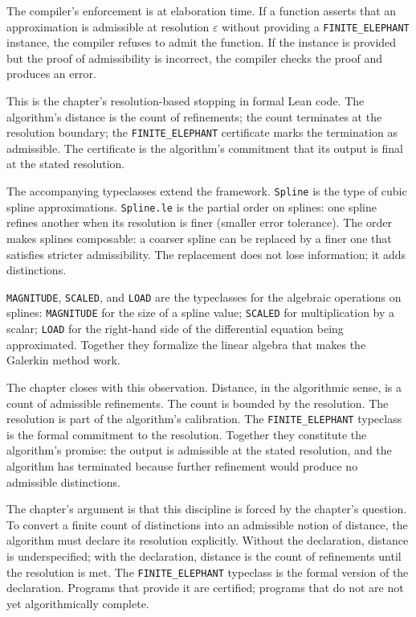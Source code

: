 The compiler's enforcement is at elaboration time. If a function
asserts that an approximation is admissible at resolution
$\varepsilon$ without providing a \texttt{FINITE\_ELEPHANT} instance,
the compiler refuses to admit the function. If the instance is
provided but the proof of admissibility is incorrect, the compiler
checks the proof and produces an error.

This is the chapter's resolution-based stopping in formal Lean code.
The algorithm's distance is the count of refinements; the count
terminates at the resolution boundary; the \texttt{FINITE\_ELEPHANT}
certificate marks the termination as admissible. The certificate is
the algorithm's commitment that its output is final at the stated
resolution.

The accompanying typeclasses extend the framework. \texttt{Spline}
is the type of cubic spline approximations. \texttt{Spline.le} is the
partial order on splines: one spline refines another when its
resolution is finer (smaller error tolerance). The order makes
splines composable: a coarser spline can be replaced by a finer one
that satisfies stricter admissibility. The replacement does not lose
information; it adds distinctions.

\texttt{MAGNITUDE}, \texttt{SCALED}, and \texttt{LOAD} are the
typeclasses for the algebraic operations on splines:
\texttt{MAGNITUDE} for the size of a spline value; \texttt{SCALED}
for multiplication by a scalar; \texttt{LOAD} for the right-hand side
of the differential equation being approximated. Together they
formalize the linear algebra that makes the Galerkin method work.

The chapter closes with this observation. Distance, in the
algorithmic sense, is a count of admissible refinements. The count
is bounded by the resolution. The resolution is part of the
algorithm's calibration. The \texttt{FINITE\_ELEPHANT} typeclass is
the formal commitment to the resolution. Together they constitute
the algorithm's promise: the output is admissible at the stated
resolution, and the algorithm has terminated because further
refinement would produce no admissible distinctions.

The chapter's argument is that this discipline is forced by the
chapter's question. To convert a finite count of distinctions into
an admissible notion of distance, the algorithm must declare its
resolution explicitly. Without the declaration, distance is
underspecified; with the declaration, distance is the count of
refinements until the resolution is met. The \texttt{FINITE\_ELEPHANT}
typeclass is the formal version of the declaration. Programs that
provide it are certified; programs that do not are not yet
algorithmically complete.

